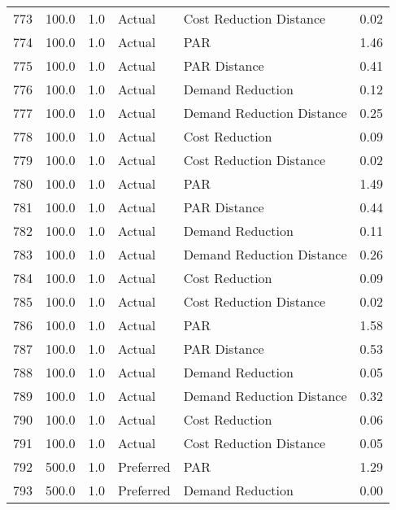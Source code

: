 \begin{longtable}{lrrllr}
773  &        100.0 &     1.0 &         Actual &    Cost Reduction Distance &   0.02 \\
774  &        100.0 &     1.0 &         Actual &                        PAR &   1.46 \\
775  &        100.0 &     1.0 &         Actual &               PAR Distance &   0.41 \\
776  &        100.0 &     1.0 &         Actual &           Demand Reduction &   0.12 \\
777  &        100.0 &     1.0 &         Actual &  Demand Reduction Distance &   0.25 \\
778  &        100.0 &     1.0 &         Actual &             Cost Reduction &   0.09 \\
779  &        100.0 &     1.0 &         Actual &    Cost Reduction Distance &   0.02 \\
780  &        100.0 &     1.0 &         Actual &                        PAR &   1.49 \\
781  &        100.0 &     1.0 &         Actual &               PAR Distance &   0.44 \\
782  &        100.0 &     1.0 &         Actual &           Demand Reduction &   0.11 \\
783  &        100.0 &     1.0 &         Actual &  Demand Reduction Distance &   0.26 \\
784  &        100.0 &     1.0 &         Actual &             Cost Reduction &   0.09 \\
785  &        100.0 &     1.0 &         Actual &    Cost Reduction Distance &   0.02 \\
786  &        100.0 &     1.0 &         Actual &                        PAR &   1.58 \\
787  &        100.0 &     1.0 &         Actual &               PAR Distance &   0.53 \\
788  &        100.0 &     1.0 &         Actual &           Demand Reduction &   0.05 \\
789  &        100.0 &     1.0 &         Actual &  Demand Reduction Distance &   0.32 \\
790  &        100.0 &     1.0 &         Actual &             Cost Reduction &   0.06 \\
791  &        100.0 &     1.0 &         Actual &    Cost Reduction Distance &   0.05 \\
792  &        500.0 &     1.0 &      Preferred &                        PAR &   1.29 \\
793  &        500.0 &     1.0 &      Preferred &           Demand Reduction &   0.00 \\

\end{longtable}
